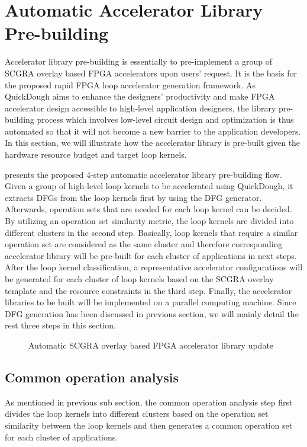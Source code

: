 \section{Automatic Accelerator Library Pre-building} \label{sec:lib-build}
 Accelerator library pre-building is essentially to pre-implement a group of SCGRA overlay based FPGA accelerators upon users' request. It is the basis for the proposed rapid FPGA loop accelerator generation framework. As QuickDough aims to enhance the designers' productivity and make FPGA accelerator design accessible to high-level application designers, the library pre-building process which involves low-level circuit design and optimization is thus automated so that it will not become a new barrier to the application developers. In this section, we will illustrate how the accelerator library is pre-built given the hardware resource budget and target loop kernels.

 presents the proposed 4-step automatic accelerator library pre-building flow. Given a group of high-level loop kernels to be accelerated using QuickDough, it extracts DFGs from the loop kernels first by using the DFG generator. Afterwards, operation sets that are needed for each loop kernel can be decided. By utilizing an operation set similarity metric, the loop kernels are divided into different clusters in the second step. Basically, loop kernels that require a similar operation set are considered as the same cluster and therefore corresponding accelerator library will be pre-built for each cluster of applications in next steps. After the loop kernel classification, a representative accelerator configurations will be generated for each cluster of loop kernels based on the SCGRA overlay template and the resource constraints in the third step. Finally, the accelerator libraries to be built will be implemented on a parallel computing machine. Since DFG generation has been discussed in previous section, we will mainly detail the rest three steps in this section.

\begin{figure}
\vspace{-1em}
\caption{Automatic SCGRA overlay based FPGA accelerator library update}
\label{fig:auto-lib-gen}
\vspace{-1.5em}
\end{figure}

\subsection{Common operation analysis}
As mentioned in previous sub section, the common operation analysis step first divides the loop kernels into different clusters based on the operation set similarity between the loop kernels and then generates a common operation set for each cluster of applications. 

